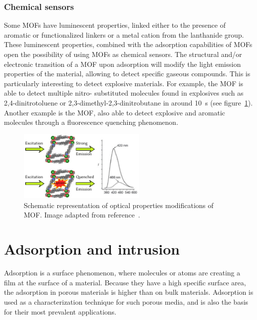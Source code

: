 \documentclass[thesis]{subfiles}
\begin{document}
\subsubsection{Chemical sensors}

Some MOFs have luminescent properties, linked either to the presence of aromatic
or functionalized linkers or a metal cation from the lanthanide group. These
luminescent properties, combined with the adsorption capabilities of MOFs open
the possibility of using MOFs as chemical sensors. The structural and/or
electronic transition of a MOF upon adsorption will modify the light emission
properties of the material, allowing to detect specific gaseous compounds. This
is particularly interesting to detect explosive materials. For example, the
 MOF is able to detect multiple nitro- substituted
molecules found in explosives such as 2,4-dinitrotoluene or
2,3-dimethyl-2,3-dinitrobutane in around \SI{10}{s}\cite{Lan2009} (see
figure~\ref{fig:chemical-sensor}). Another example is the 
MOF, also able to detect explosive and aromatic molecules through a fluorescence
quenching phenomenon\cite{Pramanik2011}.

\begin{figure}[ht]
    \centering
    \includegraphics[width=0.55\textwidth]{figures/cited/chemical-sensor}
    \caption{Schematic representation of optical properties modifications of
     MOF. Image adapted from reference~\cite{Lan2009}.}
    \label{fig:chemical-sensor}
\end{figure}

\section{Adsorption and intrusion}

Adsorption is a surface phenomenon, where molecules or atoms are creating a film
at the surface of a material. Because they have a high specific surface area,
the adsorption in porous materials is higher than on bulk materials. Adsorption
is used as a characterization technique for such porous media, and is also the
basis for their most prevalent applications.
\end{document}
